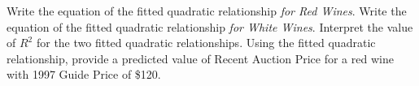 \documentclass[addpoints]{examsetup}\usepackage[]{graphicx}\usepackage[]{color}
\begin{document}
\begin{questions}
\begin{parts}
   \begin{subparts}
      \subpart[5] Write the equation of the fitted quadratic relationship \textit{for Red Wines}. 
      \vspace{2cm}
      \subpart[5] Write the equation of the fitted quadratic relationship \textit{for White Wines}. 
      \vspace{2cm}
      \subpart[5] Interpret the value of $R^2$ for the two fitted quadratic relationships.
      \vspace{2cm}
      \subpart[5] Using the fitted quadratic relationship, provide a predicted value of Recent Auction Price for a red wine with 1997 Guide Price of \$120.
   \end{subparts}
\end{parts}



\end{questions}
\end{document}
